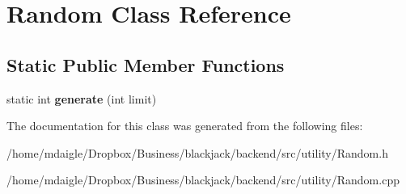 \hypertarget{classRandom}{
\section{\-Random \-Class \-Reference}
\label{d5/d78/classRandom}
}
\subsection*{\-Static \-Public \-Member \-Functions}
\begin{DoxyCompactItemize}
\item 
\hypertarget{classRandom_ade56a1f0cea6fbf8f445e4f6faa10eff}{
static int {\bfseries generate} (int limit)}
\label{d5/d78/classRandom_ade56a1f0cea6fbf8f445e4f6faa10eff}

\end{DoxyCompactItemize}


\-The documentation for this class was generated from the following files\-:\begin{DoxyCompactItemize}
\item 
/home/mdaigle/\-Dropbox/\-Business/blackjack/backend/src/utility/\-Random.\-h\item 
/home/mdaigle/\-Dropbox/\-Business/blackjack/backend/src/utility/\-Random.\-cpp\end{DoxyCompactItemize}
